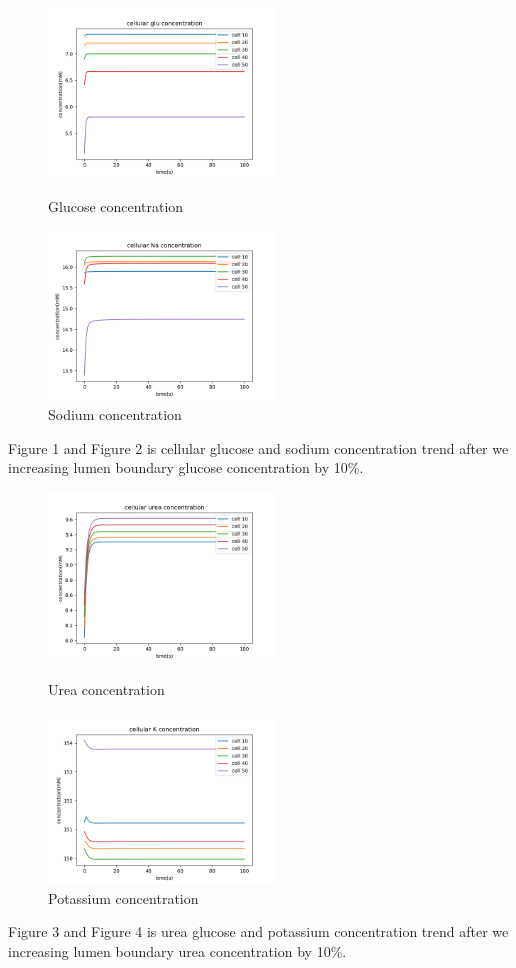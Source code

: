 \documentclass{article}
\begin{document}
\begin{figure}[H]
\centering
\begin{minipage}[t]{0.48\textwidth}
\centering
\includegraphics[width=6cm]{figure/figure1.png}
\caption{Glucose concentration}
\end{minipage}
\begin{minipage}[t]{0.48\textwidth}
\centering
\includegraphics[width=6cm]{figure/figure2.png}
\caption{Sodium concentration}
\end{minipage}
\end{figure}

Figure 1 and Figure 2 is cellular glucose and sodium concentration trend after we increasing lumen boundary glucose concentration by 10\%.

\begin{figure}[H]
\centering
\begin{minipage}[t]{0.48\textwidth}
\centering
\includegraphics[width=6cm]{figure/figure3.png}
\caption{Urea concentration}
\end{minipage}
\begin{minipage}[t]{0.48\textwidth}
\centering
\includegraphics[width=6cm]{figure/figure4.png}
\caption{Potassium concentration}
\end{minipage}
\end{figure}
Figure 3 and Figure 4 is urea glucose and potassium concentration trend after we increasing lumen boundary urea concentration by 10\%.
\end{document}
